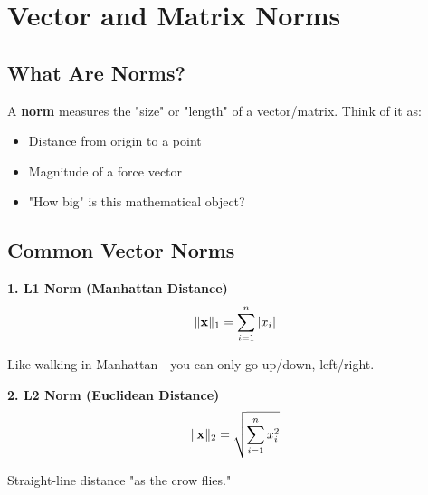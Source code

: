 \documentclass{article}
\begin{document}
\begin{center}
\end{center}

\section{Vector and Matrix Norms}

\subsection{What Are Norms?}

A \textbf{norm} measures the "size" or "length" of a vector/matrix. Think of it as:
\begin{itemize}
    \item Distance from origin to a point
    \item Magnitude of a force vector
    \item "How big" is this mathematical object?
\end{itemize}

\subsection{Common Vector Norms}

\textbf{1. L1 Norm (Manhattan Distance)}
$$\|\mathbf{x}\|_1 = \sum_{i=1}^n |x_i|$$

Like walking in Manhattan - you can only go up/down, left/right.

\textbf{2. L2 Norm (Euclidean Distance)}
$$\|\mathbf{x}\|_2 = \sqrt{\sum_{i=1}^n x_i^2}$$

Straight-line distance "as the crow flies."
\end{document}
